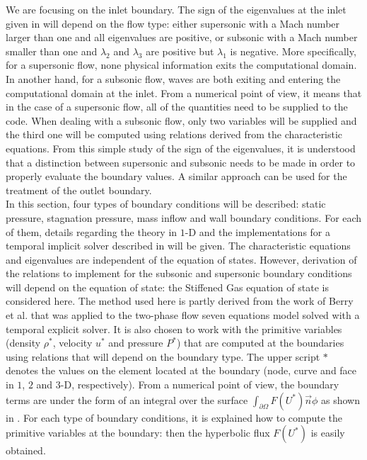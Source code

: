 We are focusing on the inlet boundary. The sign of the eigenvalues at the inlet given in  will depend on the flow type: either supersonic with a Mach number larger than one and all eigenvalues are positive, or subsonic with a Mach number smaller than one and $\lambda_2$ and $\lambda_3$ are positive but $\lambda_1$ is negative. More specifically, for a supersonic flow, none physical information exits the computational domain. In another hand, for a subsonic flow, waves are both exiting and entering the computational domain at the inlet. From a numerical point of view, it means that in the case of a supersonic flow, all of the quantities need to be supplied to the code. When dealing with a subsonic flow, only two variables will be supplied and the third one will be computed using relations derived from the characteristic equations. From this simple study of the sign of the eigenvalues, it is understood that a distinction between supersonic and subsonic needs to be made in order to properly evaluate the boundary values. A similar approach can be used for the treatment of the outlet boundary. \\
In this section, four types of boundary conditions will be described: static pressure, stagnation pressure, mass inflow and wall boundary conditions. For each of them, details regarding the theory in $1$-D and the implementations for a temporal implicit solver described in  will be given. The characteristic equations and eigenvalues are independent of the equation of states. However, derivation of the relations to implement for the subsonic and supersonic boundary conditions will depend on the equation of state: the Stiffened Gas equation of state is considered here. The method used here is partly derived from the work of Berry et al. \cite{SEM} that was applied to the two-phase flow seven equations model solved with a temporal explicit solver. It is also chosen to work with the primitive variables (density $\rho^*$, velocity $u^*$ and pressure $P^*$) that are computed at the boundaries using relations that will depend on the boundary type. The upper script $*$ denotes the values on the element located at the boundary (node, curve and face in $1$, $2$ and $3$-D, respectively). From a numerical point of view, the boundary terms are under the form of an integral over the surface $\int_{\partial \Omega} F(U^*) \vec{n} \phi$ as shown in . For each type of boundary conditions, it is explained how to compute the primitive variables at the boundary: then the hyperbolic flux $F(U^*)$ is easily obtained.
